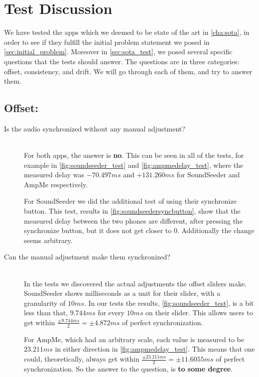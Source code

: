 \section{Test Discussion}

We have tested the apps which we deemed to be state of the art in \cref{cha:sota}, in order to see if they fulfill the initial problem statement we posed in \vref{sec:initial_problem}.
Moreover in \vref{sec:sota_test}, we posed several specific questions that the tests should answer. 
The questions are in three categories: offset, consistency, and drift.
We will go through each of them, and try to answer them.

\subsection*{Offset:}
\begin{description}
    \item[Is the audio synchronized without any manual adjustment?] \hfill \\
    For both apps, the answer is \textbf{no}. 
    This can be seen in all of the tests, for example in \vref{fig:soundseeder_test} and \vref{fig:ampmedelay_test}, where the measured delay was $-70.497 ms$ and $+131.260 ms$ for SoundSeeder and AmpMe respectively.
    
    For SoundSeeder we did the additional test of using their synchronize button. 
    This test, results in \vref{fig:soundseedersyncbutton}, show that the measured delay between the two phones are different, after pressing the synchronize button, but it does not get closer to $0$. 
    Additionally the change seems arbitrary.  
    \item[Can the manual adjustment make them synchronized?] \hfill \\
    In the tests we discovered the actual adjustments the offset sliders make. 
    SoundSeeder shows milliseconds as a unit for their slider, with a granularity of $10 ms$.
    In our tests the results, \vref{fig:soundseeder_test}, is a bit less than that, $9.744 ms$ for every $10 ms$ on their slider.
    This allows users to get within $\frac{\pm9.744 ms}{2}=\pm 4.872 ms$ of perfect synchronization.
    
    For AmpMe, which had an arbitrary scale, each value is measured to be $23.211 ms$ in either direction in \vref{fig:ampmedelay_test}.
    This means that one could, theoretically, always get within $\frac{\pm23.211 ms}{2}=\pm 11.6055 ms$ of perfect synchronization. 
    So the answer to the question, is \textbf{to some degree}.
\end{description}

